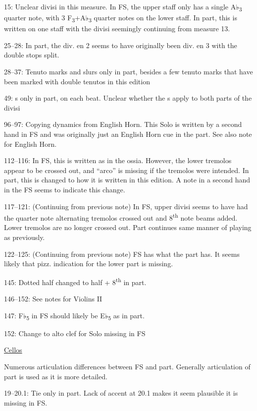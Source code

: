 \documentclass[twoside]{article}
\newcommand\dynmark[1]{\scalebox{0.9}{#1}{\kern1pt}}
\begin{document}
\begin{hangparas}{15pt}{1}
\begin{multicols}{2}
15: Unclear divisi in this measure. In FS, the upper staff only has a single A♭\textsubscript{3} quarter note, with 3 F\textsubscript{3}+A♭\textsubscript{3} quarter notes on the lower staff. In part, this is written on one staff with the divisi seemingly continuing from measure 13.

25--28: In part, the div. en 2 seems to have originally been div. en 3 with the double stops split.

28--37: Tenuto marks and slurs only in part, besides a few tenuto marks that have been marked with double tenutos in this edition

49: \dynmark{\sF}s only in part, on each beat. Unclear whether the \dynmark{\sF}s apply to both parts of the divisi

96--97: Copying dynamics from English Horn. This Solo is written by a second hand in FS and was originally just an English Horn cue in the part. See also note for English Horn.

112--116: In FS, this is written as in the ossia. However, the lower tremolos appear to be crossed out, and ``arco'' is missing if the tremolos were intended. In part, this is changed to how it is written in this edition. A note in a second hand in the FS seems to indicate this change.

117--121: (Continuing from previous note) In FS, upper divisi seems to have had the quarter note alternating tremolos crossed out and 8\textsuperscript{th} note beams added. Lower tremolos are no longer crossed out. Part continues same manner of playing as previously.

122--125: (Continuing from previous note) FS has what the part has. It seems likely that pizz. indication for the lower part is missing.

145: Dotted half changed to half + 8\textsuperscript{th} in part.

146--152: See notes for Violins II

147: F♭\textsubscript{5} in FS should likely be E♭\textsubscript{5} as in part.

152: Change to alto clef for Solo missing in FS

\columnbreak

\underline{Cellos}

Numerous articulation differences between FS and part. Generally articulation of part is used as it is more detailed.

19--20.1: Tie only in part. Lack of accent at 20.1 makes it seem plausible it is missing in FS.


\end{multicols}
\end{hangparas}
\end{document}
